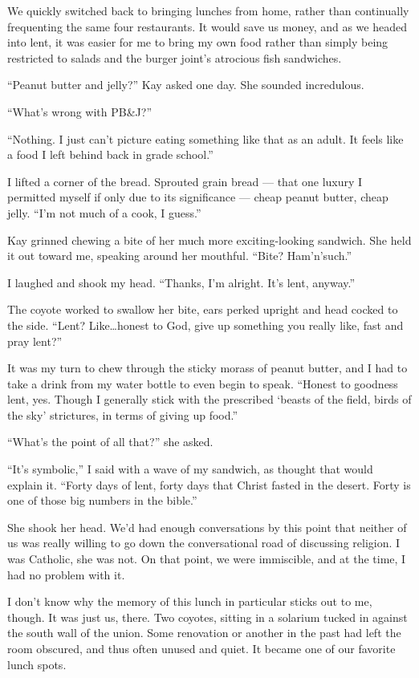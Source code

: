 We quickly switched back to bringing lunches from home, rather than continually frequenting the same four restaurants. It would save us money, and as we headed into lent, it was easier for me to bring my own food rather than simply being restricted to salads and the burger joint's atrocious fish sandwiches.

``Peanut butter and jelly?'' Kay asked one day. She sounded incredulous.

``What's wrong with PB\&J?''

``Nothing. I just can't picture eating something like that as an adult. It feels like a food I left behind back in grade school.''

I lifted a corner of the bread. Sprouted grain bread --- that one luxury I permitted myself if only due to its significance --- cheap peanut butter, cheap jelly. ``I'm not much of a cook, I guess.''

Kay grinned chewing a bite of her much more exciting-looking sandwich. She held it out toward me, speaking around her mouthful. ``Bite? Ham'n'such.''

I laughed and shook my head. ``Thanks, I'm alright. It's lent, anyway.''

The coyote worked to swallow her bite, ears perked upright and head cocked to the side. ``Lent? Like\ldots honest to God, give up something you really like, fast and pray lent?''

It was my turn to chew through the sticky morass of peanut butter, and I had to take a drink from my water bottle to even begin to speak. ``Honest to goodness lent, yes. Though I generally stick with the prescribed `beasts of the field, birds of the sky' strictures, in terms of giving up food.''

``What's the point of all that?'' she asked.

``It's symbolic,'' I said with a wave of my sandwich, as thought that would explain it. ``Forty days of lent, forty days that Christ fasted in the desert. Forty is one of those big numbers in the bible.''

She shook her head. We'd had enough conversations by this point that neither of us was really willing to go down the conversational road of discussing religion. I was Catholic, she was not. On that point, we were immiscible, and at the time, I had no problem with it.

I don't know why the memory of this lunch in particular sticks out to me, though. It was just us, there. Two coyotes, sitting in a solarium tucked in against the south wall of the union. Some renovation or another in the past had left the room obscured, and thus often unused and quiet. It became one of our favorite lunch spots.

